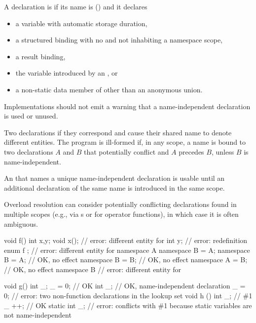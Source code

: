 \pnum
A declaration is 
if its name is \tcode{_} () and it declares
\begin{itemize}
\item
a variable with automatic storage duration,
\item
a structured binding
with no  and
not inhabiting a namespace scope,
\item
a result binding,
\item
the variable introduced by an , or
\item
a non-static data member of other than an anonymous union.
\end{itemize}

\recommended
Implementations should not emit a warning
that a name-independent declaration is used or unused.

\pnum
{}%
Two declarations 
if they correspond and
cause their shared name to denote different entities.
The program is ill-formed
if, in any scope, a name is bound to two declarations $A$ and $B$
that potentially conflict and $A$ precedes $B$,
unless $B$ is name-independent.
\begin{note}
An  that names a unique name-independent declaration
is usable until an additional declaration of the same name
is introduced in the same scope.
\end{note}
\begin{note}
Overload resolution can consider potentially conflicting declarations
found in multiple scopes
(e.g., via s or for operator functions),
in which case it is often ambiguous.
\end{note}
\begin{example}
\begin{codeblock}
void f() {
  int x,y;
  void x();             // error: different entity for 
  int y;                // error: redefinition
}
enum { f };             // error: different entity for 
namespace A {}
namespace B = A;
namespace B = A;        // OK, no effect
namespace B = B;        // OK, no effect
namespace A = B;        // OK, no effect
namespace B {}          // error: different entity for 

void g() {
  int _;
  _ = 0;                // OK
  int _;                // OK, name-independent declaration
  _ = 0;                // error: two non-function declarations in the lookup set
}
void h () {
  int _;                // \#1
  _ ++;                 // OK
  static int _;         // error: conflicts with \#1 because static variables are not name-independent
}
\end{codeblock}
\end{example}

